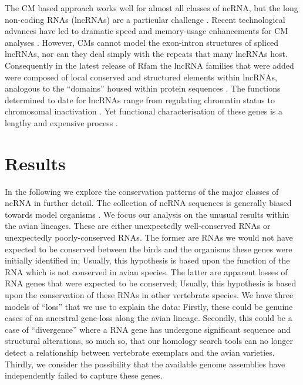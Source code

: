\documentclass[10pt]{bmc_article}
\newenvironment{bmcformat}{\begin{raggedright}\baselineskip20pt\sloppy\setboolean{publ}{false}}{\end{raggedright}\baselineskip20pt\sloppy}
\begin{document}
\begin{bmcformat}
The CM based approach works well for almost all classes of ncRNA, but
the long non-coding RNAs (lncRNAs) are a particular challenge
\cite{Guttman:2009}. Recent technological advances have led to dramatic
speed and memory-usage enhancements for CM analyses
\cite{Eddy:2002,Nawrocki:2007,Nawrocki:2009,Eddy:2011}. However, CMs
cannot model the exon-intron structures of spliced lncRNAs, nor can they
deal simply with the repeats that many lncRNAs host. Consequently in
the latest release of Rfam the lncRNA families that were added were
composed of local conserved and structured elements within lncRNAs,
analogous to the ``domains'' housed within protein sequences
\cite{Burge:2013}. The functions determined to date for lncRNAs
range from regulating chromatin status to chromosomal inactivation
\cite{Rinn:2007,Chow:2005}. Yet functional characterisation of these
genes is a lengthy and expensive process \cite{Guttman:2009}.


\section*{Results}
In the following we explore the conservation patterns of the major
classes of ncRNA in further detail. The collection of ncRNA sequences
is generally biased towards model organisms
\cite{Gardner:2010,Hoeppner:2012}. We focus our analysis on the
unusual results within the avian lineages. These are either
unexpectedly well-conserved RNAs or unexpectedly poorly-conserved
RNAs. The former are RNAs we would not have expected to be conserved
between the birds and the organisms these genes were initially
identified in; Usually, this hypothesis is based upon the function of
the RNA which is not conserved in avian species. The latter are
apparent losses of RNA genes that were expected to be conserved;
Usually, this hypothesis is based upon the conservation of these RNAs
in other vertebrate species. We have three models of ``loss'' that we
use to explain the data: Firstly, these could be genuine cases of an
ancestral gene-loss along the avian lineage. Secondly, this could be a
case of ``divergence'' where a RNA gene has undergone significant
sequence and structural alterations, so much so, that our homology
search tools can no longer detect a relationship between vertebrate
exemplars and the avian varieties. Thirdly, we consider the
possibility that the available genome assemblies have independently
failed to capture these genes.



\end{bmcformat}
\end{document}

